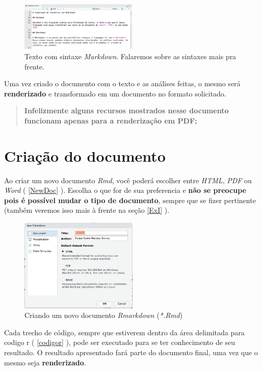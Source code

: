 \documentclass[]{book}
\begin{document}
\begin{figure}
\centering
\includegraphics[width=0.5\textwidth,height=\textheight]{./img/TxtRmd.png}
\caption{Texto com sintaxe \emph{Markdown}. Falaremos sobre as sintaxes mais pra frente. \label{txtrmd}}
\end{figure}

Uma vez criado o documento com o texto e as análises feitas, o mesmo será \textbf{renderizado} e transformado em um documento no formato solicitado.

\begin{quote}
\textbf{Infelizmente alguns recursos mostrados nesse documento funcionam apenas para a renderização em PDF;}
\end{quote}

\hypertarget{CriacaoDoc}{%
\chapter{Criação do documento}\label{CriacaoDoc}}

Ao criar um novo documento \emph{Rmd}, você poderá escolher entre \emph{HTML}, \emph{PDF} ou \emph{Word} ( \autoref{NewDoc} ). Escolha o que for de sua preferencia e \textbf{não se preocupe pois é possível mudar o tipo de documento}, sempre que se fizer pertinente (também veremos isso mais à frente na seção \ref{ExI} ).

\begin{figure}
\centering
\includegraphics[width=0.5\textwidth,height=\textheight]{./img/TipoDoc.png}
\caption{Criando um novo documento \emph{Rmarkdown} (\emph{*.Rmd}) \label{NewDoc}}
\end{figure}

Cada trecho de código, sempre que estiverem dentro da área delimitada para codigo r ( \autoref{codigor} ), pode ser executado para se ter conhecimento de seu resultado. O resultado apresentado fará parte do documento final, uma vez que o mesmo seja \textbf{renderizado}.
\end{document}
